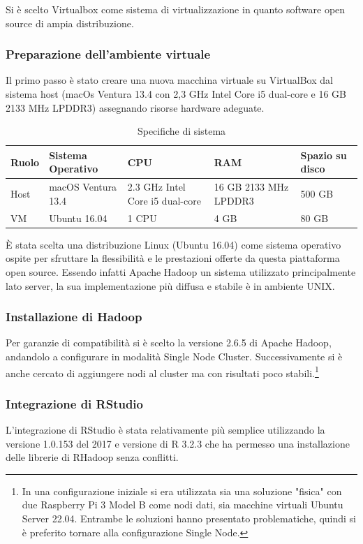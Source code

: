 Si è scelto Virtualbox come sistema di virtualizzazione in quanto software open source di ampia distribuzione.
\subsubsection{Preparazione dell'ambiente virtuale}
Il primo passo è stato creare una nuova macchina virtuale su VirtualBox dal sistema host (macOs Ventura 13.4 con 2,3 GHz Intel Core i5 dual-core e 16 GB 2133 MHz LPDDR3) assegnando risorse hardware adeguate.
\begin{table}[ht]
\centering
\begin{tabularx}{\textwidth}{|X|X|X|X|X|}
\hline
Ruolo & Sistema Operativo & CPU & RAM & Spazio su disco \\
\hline
Host & macOS Ventura 13.4 & 2.3 GHz Intel Core i5 dual-core & 16 GB 2133 MHz LPDDR3 & 500 GB \\
\hline
VM & Ubuntu 16.04 & 1 CPU & 4 GB & 80 GB \\
\hline
\end{tabularx}
\caption{Specifiche di sistema}
\label{tab:specifiche}
\end{table}
    
È stata scelta una distribuzione Linux (Ubuntu 16.04) come sistema operativo ospite per sfruttare la flessibilità e le prestazioni offerte da questa piattaforma open source. Essendo infatti Apache Hadoop un sistema utilizzato principalmente lato server, la sua implementazione più diffusa e stabile è in ambiente UNIX.
\subsubsection{Installazione di Hadoop}
Per garanzie di compatibilità si è scelto la versione 2.6.5 di Apache Hadoop, andandolo a configurare in modalità Single Node Cluster. Successivamente si è anche cercato di aggiungere nodi al cluster ma con risultati poco stabili.\footnote{In una configurazione iniziale si era utilizzata sia una soluzione "fisica" con due Raspberry Pi 3 Model B come nodi dati, sia macchine virtuali Ubuntu Server 22.04. Entrambe le soluzioni hanno presentato problematiche, quindi si è preferito tornare alla configurazione Single Node.}
\subsubsection{Integrazione di RStudio}
L'integrazione di RStudio è stata relativamente più semplice utilizzando la versione 1.0.153 del 2017 e versione di R 3.2.3 che ha permesso una installazione delle librerie di RHadoop senza conflitti.
